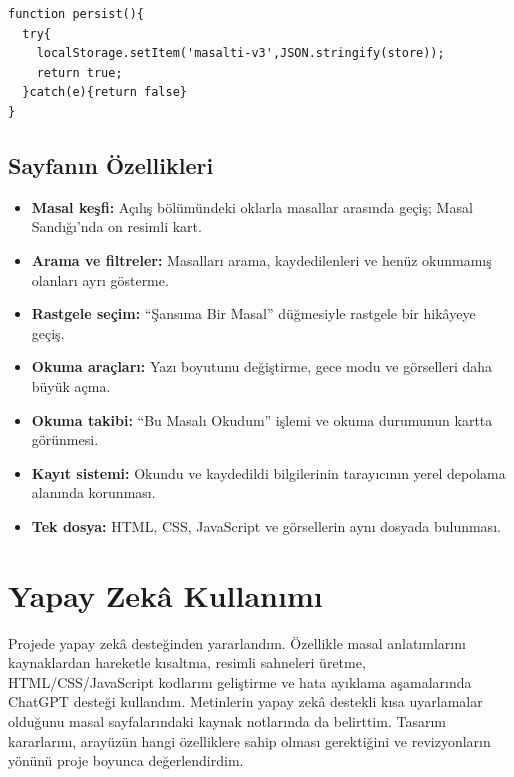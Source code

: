 \documentclass[12pt,a4paper]{article}
\begin{document}
\begin{lstlisting}[caption={Tarayiciya kayit isleminin gercek koddan alintisi}]
function persist(){
  try{
    localStorage.setItem('masalti-v3',JSON.stringify(store));
    return true;
  }catch(e){return false}
}
\end{lstlisting}

\subsection{Sayfanın Özellikleri}
\begin{itemize}
\item \textbf{Masal keşfi:} Açılış bölümündeki oklarla masallar arasında geçiş; Masal Sandığı'nda on resimli kart.
\item \textbf{Arama ve filtreler:} Masalları arama, kaydedilenleri ve henüz okunmamış olanları ayrı gösterme.
\item \textbf{Rastgele seçim:} ``Şansıma Bir Masal'' düğmesiyle rastgele bir hikâyeye geçiş.
\item \textbf{Okuma araçları:} Yazı boyutunu değiştirme, gece modu ve görselleri daha büyük açma.
\item \textbf{Okuma takibi:} ``Bu Masalı Okudum'' işlemi ve okuma durumunun kartta görünmesi.
\item \textbf{Kayıt sistemi:} Okundu ve kaydedildi bilgilerinin tarayıcının yerel depolama alanında korunması.
\item \textbf{Tek dosya:} HTML, CSS, JavaScript ve görsellerin aynı dosyada bulunması.
\end{itemize}

\section{Yapay Zekâ Kullanımı}
Projede yapay zekâ desteğinden yararlandım. Özellikle masal anlatımlarını kaynaklardan hareketle kısaltma, resimli sahneleri üretme, HTML/CSS/JavaScript kodlarını geliştirme ve hata ayıklama aşamalarında ChatGPT desteği kullandım. Metinlerin yapay zekâ destekli kısa uyarlamalar olduğunu masal sayfalarındaki kaynak notlarında da belirttim. Tasarım kararlarını, arayüzün hangi özelliklere sahip olması gerektiğini ve revizyonların yönünü proje boyunca değerlendirdim.
\end{document}
